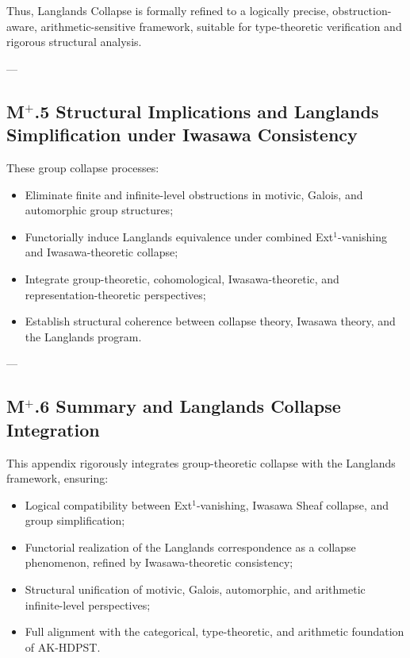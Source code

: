 \documentclass[11pt]{article}
\begin{document}
Thus, Langlands Collapse is formally refined to a logically precise, obstruction-aware, arithmetic-sensitive framework, suitable for type-theoretic verification and rigorous structural analysis.


---

\subsection*{M$^{+}$.5 Structural Implications and Langlands Simplification under Iwasawa Consistency}

These group collapse processes:

\begin{itemize}
    \item Eliminate finite and infinite-level obstructions in motivic, Galois, and automorphic group structures;
    \item Functorially induce Langlands equivalence under combined Ext$^1$-vanishing and Iwasawa-theoretic collapse;
    \item Integrate group-theoretic, cohomological, Iwasawa-theoretic, and representation-theoretic perspectives;
    \item Establish structural coherence between collapse theory, Iwasawa theory, and the Langlands program.
\end{itemize}

---

\subsection*{M$^{+}$.6 Summary and Langlands Collapse Integration}

This appendix rigorously integrates group-theoretic collapse with the Langlands framework, ensuring:

\begin{itemize}
    \item Logical compatibility between Ext$^1$-vanishing, Iwasawa Sheaf collapse, and group simplification;
    \item Functorial realization of the Langlands correspondence as a collapse phenomenon, refined by Iwasawa-theoretic consistency;
    \item Structural unification of motivic, Galois, automorphic, and arithmetic infinite-level perspectives;
    \item Full alignment with the categorical, type-theoretic, and arithmetic foundation of AK-HDPST.
\end{itemize}
\end{document}
